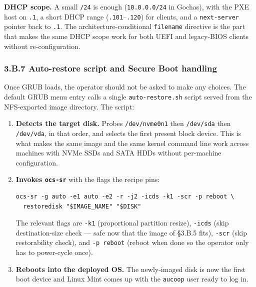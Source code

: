 \textbf{DHCP scope.} A small \texttt{/24} is enough
(\texttt{10.0.0.0/24} in Gochas), with the PXE host on \texttt{.1}, a
short DHCP range (\texttt{.101}--\texttt{.120}) for clients, and a
\texttt{next-server} pointer back to \texttt{.1}. The
architecture-conditional \texttt{filename} directive is the part that
makes the same DHCP scope work for both UEFI and legacy-BIOS clients
without re-configuration.

\hypertarget{b.7-auto-restore-script-and-secure-boot-handling}{%
\subsubsection{3.B.7 Auto-restore script and Secure Boot
handling}\label{b.7-auto-restore-script-and-secure-boot-handling}}

Once GRUB loads, the operator should not be asked to make any choices.
The default GRUB menu entry calls a single \texttt{auto-restore.sh}
script served from the NFS-exported image directory. The script:

\begin{enumerate}
\def\labelenumi{\arabic{enumi}.}
\item
  \textbf{Detects the target disk.} Probes \texttt{/dev/nvme0n1} then
  \texttt{/dev/sda} then \texttt{/dev/vda}, in that order, and selects
  the first present block device. This is what makes the same image and
  the same kernel command line work across machines with NVMe SSDs and
  SATA HDDs without per-machine configuration.
\item
  \textbf{Invokes \texttt{ocs-sr}} with the flags the recipe pins:

\begin{verbatim}
ocs-sr -g auto -e1 auto -e2 -r -j2 -icds -k1 -scr -p reboot \
  restoredisk "$IMAGE_NAME" "$DISK"
\end{verbatim}

  The relevant flags are \texttt{-k1} (proportional partition resize),
  \texttt{-icds} (skip destination-size check --- safe now that the
  image of §3.B.5 fits), \texttt{-scr} (skip restorability check), and
  \texttt{-p\ reboot} (reboot when done so the operator only has to
  power-cycle once).
\item
  \textbf{Reboots into the deployed OS.} The newly-imaged disk is now
  the first boot device and Linux Mint comes up with the \texttt{aucoop}
  user ready to log in.
\end{enumerate}

